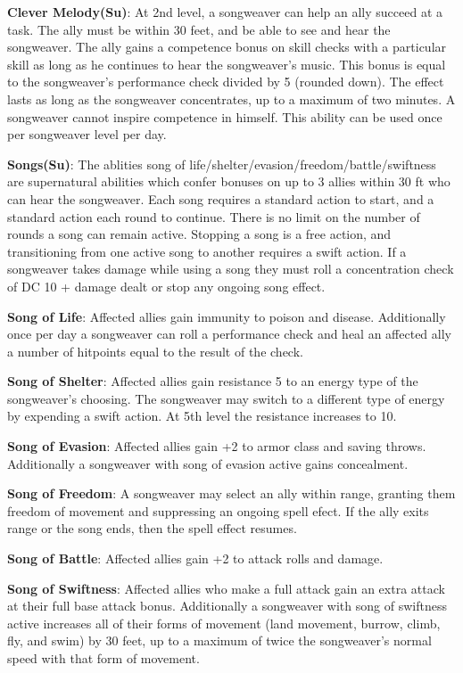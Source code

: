 \textbf{Clever Melody(Su)}: At 2nd level, a songweaver can help an ally succeed at a task. The ally must be within 30 feet, and be able to see and hear the songweaver. The ally gains a competence bonus on skill checks with a particular skill as long as he continues to hear the songweaver's music. This bonus is equal to the songweaver's performance check divided by 5 (rounded down). The effect lasts as long as the songweaver concentrates, up to a maximum of two minutes. A songweaver cannot inspire competence in himself. This ability can be used once per songweaver level per day.

\textbf{Songs(Su)}: The ablities song of life/shelter/evasion/freedom/battle/swiftness are supernatural abilities which confer bonuses on up to 3 allies within 30 ft who can hear the songweaver. Each song requires a standard action to start, and a standard action each round to continue. There is no limit on the number of rounds a song can remain active. Stopping a song is a free action, and transitioning from one active song to another requires a swift action. If a songweaver takes damage while using a song they must roll a concentration check of DC 10 + damage dealt or stop any ongoing song effect.

\textbf{Song of Life}: Affected allies gain immunity to poison and disease. Additionally once per day a songweaver can roll a performance check and heal an affected ally a number of hitpoints equal to the result of the check.

\textbf{Song of Shelter}: Affected allies gain resistance 5 to an energy type of the songweaver's choosing. The songweaver may switch to a different type of energy by expending a swift action. At 5th level the resistance increases to 10.

\textbf{Song of Evasion}: Affected allies gain +2 to armor class and saving throws. Additionally a songweaver with song of evasion active gains concealment.

\textbf{Song of Freedom}: A songweaver may select an ally within range, granting them freedom of movement and suppressing an ongoing spell efect. If the ally exits range or the song ends, then the spell effect resumes.

\textbf{Song of Battle}: Affected allies gain +2 to attack rolls and damage.

\textbf{Song of Swiftness}: Affected allies who make a full attack gain an extra attack at their full base attack bonus. Additionally a songweaver with song of swiftness active increases all of their forms of movement (land movement, burrow, climb, fly, and swim) by 30 feet, up to a maximum of twice the songweaver's normal speed with that form of movement.

